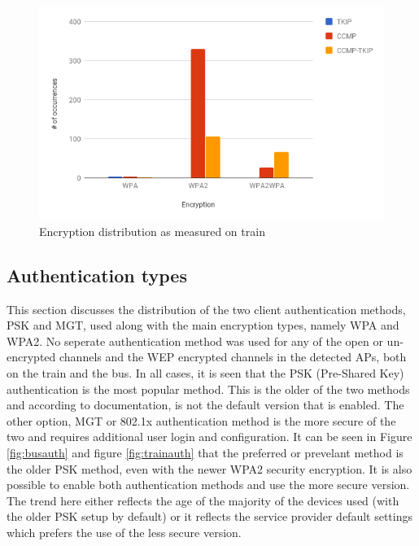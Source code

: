\documentclass[letterpaper, 10 pt, conference]{ieeeconf}  %
\begin{document}
\begin{figure}[h]
\includegraphics[scale=0.4]{Figures/CipherTrain.png}
\caption{Encryption distribution as measured on train}
\label{fig:traincipher}
\end{figure}




\subsection{Authentication types}
This section discusses the distribution of the two client authentication methods, PSK and MGT, used along with the main encryption types, namely WPA and WPA2. No seperate authentication method was used for any of the open or un-encrypted channels and the WEP encrypted channels in the detected APs, both on the train and the bus. In all cases, it is seen that the PSK (Pre-Shared Key) authentication is the most popular method. This is the older of the two methods and according to documentation, is not the default version that is enabled. The other option, MGT or 802.1x authentication method is the more secure of the two and requires additional user login and configuration. It can be seen in Figure \ref{fig:busauth} and figure \ref{fig:trainauth} that the preferred or prevelant method is the older PSK method, even with the newer WPA2 security encryption. It is also possible to enable both authentication methods and use the more secure version. The trend here either reflects the age of the majority of the devices used (with the older PSK setup by default) or it reflects the service provider default settings which prefers the use of the less secure version.
\end{document}
